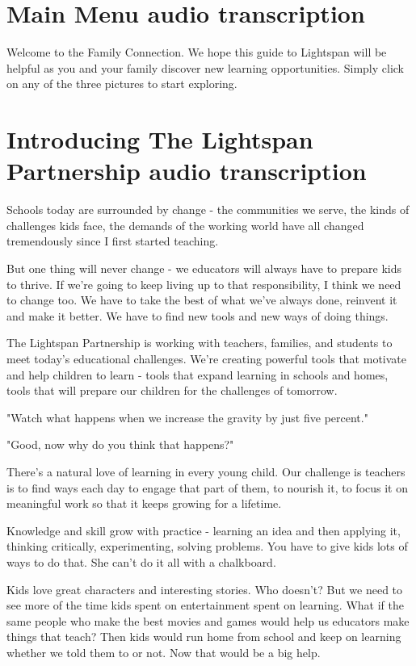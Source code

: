 \clearpage
\newpage

\section{Main Menu audio transcription}

Welcome to the Family Connection.
We hope this guide to Lightspan will be helpful as you and your family discover new learning opportunities.
Simply click on any of the three pictures to start exploring.

\section{Introducing The Lightspan Partnership audio transcription}

Schools today are surrounded by change - the communities we serve, the kinds of challenges kids face, the demands of the working world have all changed tremendously since I first started teaching.

But one thing will never change - we educators will always have to prepare kids to thrive.
If we're going to keep living up to that responsibility, I think we need to change too.
We have to take the best of what we've always done, reinvent it and make it better. We have to find new tools and new ways of doing things.

The Lightspan Partnership is working with teachers, families, and students to meet today's educational challenges.
We're creating powerful tools that motivate and help children to learn - tools that expand learning in schools and homes, tools that will prepare our children for the challenges of tomorrow.

"Watch what happens when we increase the gravity by just five percent."

"Good, now why do you think that happens?"

There's a natural love of learning in every young child. Our challenge is teachers is to find ways each day to engage that part of them, to nourish it, to focus it on meaningful work so that it keeps growing for a lifetime.

Knowledge and skill grow with practice - learning an idea and then applying it, thinking critically, experimenting, solving problems.
You have to give kids lots of ways to do that.
She can't do it all with a chalkboard.

Kids love great characters and interesting stories.
Who doesn't?
But we need to see more of the time kids spent on entertainment spent on learning.
What if the same people who make the best movies and games would help us educators make things that teach?
Then kids would run home from school and keep on learning whether we told them to or not.
Now that would be a big help.

